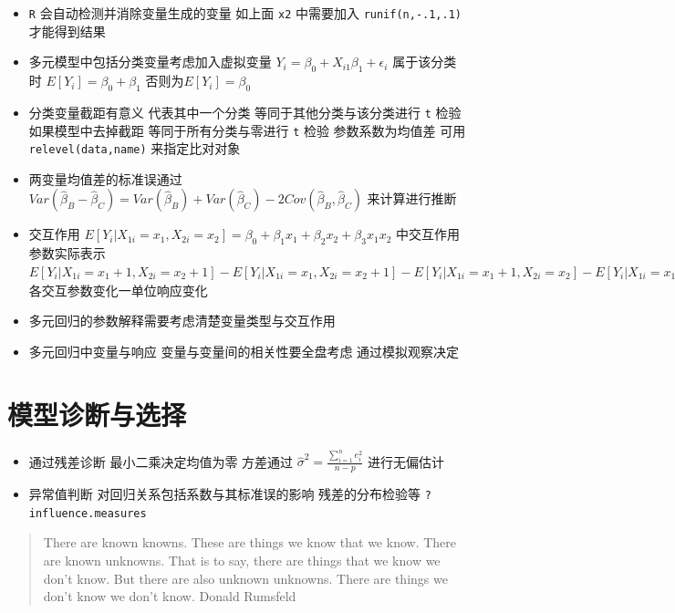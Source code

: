 \documentclass[
]{book}
\providecommand{\tightlist}{%
  \setlength{\itemsep}{0pt}\setlength{\parskip}{0pt}}
\begin{document}
\begin{itemize}
\tightlist
\item
  \texttt{R} 会自动检测并消除变量生成的变量 如上面 \texttt{x2} 中需要加入 \texttt{runif(n,-.1,.1)} 才能得到结果
\item
  多元模型中包括分类变量考虑加入虚拟变量 \(Y_i = \beta_0 + X_{i1} \beta_1 + \epsilon_{i}\) 属于该分类时 \(E[Y_i] = \beta_0 + \beta_1\) 否则为\(E[Y_i] = \beta_0\)
\item
  分类变量截距有意义 代表其中一个分类 等同于其他分类与该分类进行 \texttt{t} 检验 如果模型中去掉截距 等同于所有分类与零进行 \texttt{t} 检验 参数系数为均值差 可用 \texttt{relevel(data,\textquotesingle{}name\textquotesingle{})} 来指定比对对象
\item
  两变量均值差的标准误通过 \(Var(\hat \beta_B - \hat \beta_C) = Var(\hat \beta_B) + Var(\hat \beta_C) - 2 Cov(\hat \beta_B, \hat \beta_C)\) 来计算进行推断
\item
  交互作用 \(E[Y_i | X_{1i}=x_1, X_{2i}=x_2] = \beta_0 + \beta_1 x_{1} + \beta_2 x_{2} + \beta_3 x_{1}x_{2}\) 中交互作用参数实际表示 \(E[Y_i | X_{1i}=x_1+1, X_{2i}=x_2+1]-E[Y_i | X_{1i}=x_1, X_{2i}=x_2+1]-E[Y_i | X_{1i}=x_1+1, X_{2i}=x_2]-E[Y_i | X_{1i}=x_1, X_{2i}=x_2] =\beta_3\) 各交互参数变化一单位响应变化
\item
  多元回归的参数解释需要考虑清楚变量类型与交互作用
\item
  多元回归中变量与响应 变量与变量间的相关性要全盘考虑 通过模拟观察决定
\end{itemize}

\hypertarget{ux6a21ux578bux8bcaux65adux4e0eux9009ux62e9}{%
\section{模型诊断与选择}\label{ux6a21ux578bux8bcaux65adux4e0eux9009ux62e9}}

\begin{itemize}
\tightlist
\item
  通过残差诊断 最小二乘决定均值为零 方差通过 \(\hat \sigma^2 = \frac{\sum_{i=1}^n e_i^2}{n-p}\) 进行无偏估计
\item
  异常值判断 对回归关系包括系数与其标准误的影响 残差的分布检验等 \texttt{?influence.measures}
\end{itemize}

\begin{quote}
There are known knowns. These are things we know that we know. There are known unknowns. That is to say, there are things that we know we don't know. But there are also unknown unknowns. There are things we don't know we don't know. Donald Rumsfeld
\end{quote}
\end{document}
